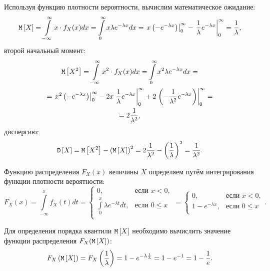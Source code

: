 Используя функцию плотности вероятности, вычислим математическое ожидание:
\begin{equation}
    \mathtt{M} \left [ X \right ]
    = \int \limits_{-\infty}^\infty x \cdot f_X(x) dx
    = \int \limits_0^\infty x \lambda e^{-\lambda x} dx
    = \left . x \left ( - e^{-\lambda x} \right ) \right |_0^\infty
    - \left . \frac{1}{\lambda} e^{-\lambda x} \right |_0^\infty
    = \frac{1}{\lambda} ,
\end{equation}
второй начальный момент:
\begin{multline}
    \mathtt{M} \left [ X^2 \right ]
    = \int \limits_{-\infty}^\infty x^2 \cdot f_X(x) dx
    = \int \limits_0^\infty x^2 \lambda e^{-\lambda x} dx = \\
    = \left . x^2 \left ( - e^{-\lambda x} \right ) \right |_0^\infty
    - 2 x \left . \frac{1}{\lambda} e^{-\lambda x} \right |_0^\infty
    + 2 \left . \left ( - \frac{1}{\lambda^2} e^{-\lambda x} \right ) \right |_0^\infty = \\
    = 2 \frac{1}{\lambda^2} ,
\end{multline}
дисперсию:
\begin{equation}
    \mathtt{D} \left [ X \right ]
    = \mathtt{M} \left [ X^2 \right ] - \left ( \mathtt{M} \left [ X \right ] \right )^2
    = 2 \frac{1}{\lambda^2} - \left ( \frac{1}{\lambda} \right )^2
    = \frac{1}{\lambda^2}.
\end{equation}

Функцию распределения $F_X(x)$ величины $X$ определяем путём интегрирования функции плотности вероятности:
\begin{equation}
    F_X(x)
    = \int \limits_{-\infty}^x f_X(t) dt
    = \left \{
    \begin{array}{ll}
        0,                                            & \text{если } x < 0,  \\
        \int \limits_{0}^x \lambda e^{-\lambda t} dt, & \text{если } 0 \le x \\
    \end{array}
    \right .
    = \left \{
    \begin{array}{ll}
        0,                  & \text{если } x < 0,  \\
        1 - e^{-\lambda x}, & \text{если } 0 \le x \\
    \end{array}
    \right .
    .
\end{equation}

Для определения порядка квантили $\mathtt{M} \left [ X \right ]$ необходимо вычислить значение функции распределения $F_X(\mathtt{M} \left [ X \right ])$:
\begin{equation}
    F_X \left ( \mathtt{M} \left [ X \right ] \right )
    = F_X \left ( \frac{1}{\lambda} \right )
    = 1 - e^{-\lambda \frac{1}{\lambda}}
    = 1 - e^{-1}
    = 1 - \frac{1}{e} .
\end{equation}

